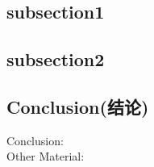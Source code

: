 \documentclass[12pt]{article}
\begin{document}
\subsection{subsection1}

\subsection{subsection2}
\subsection{Conclusion(结论)}
\begin{description}
\item[Conclusion:]
\item[Other Material:]
\end{description}
\pagebreak
\begin{thebibliography}{99}


\end{thebibliography}
\end{document}
